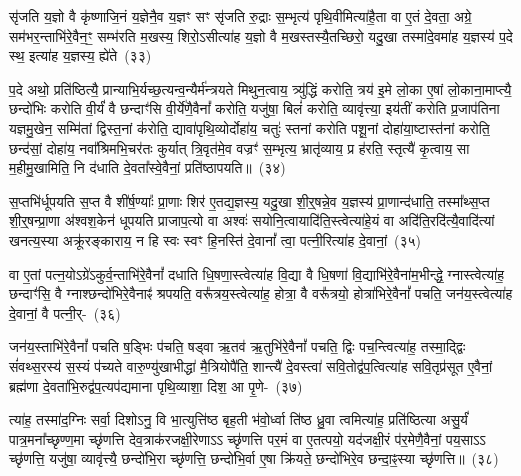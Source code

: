 सृ॑जति य॒ज्ञो वै कृ॑ष्णाजि॒नं य॒ज्ञेनै॒व य॒ज्ञꣳ सꣳ सृ॑जति रु॒द्राः स॒म्भृत्य॑ पृथि॒वीमित्या॑है॒ता वा ए॒तं दे॒वता॒ अग्रे॒ सम॑भर॒न्ताभि॑रे॒वैन॒ꣳ॒ सम्भ॑रति म॒खस्य॒ शिरो॒\-ऽसीत्या॑ह य॒ज्ञो वै म॒खस्तस्यै॒तच्छिरो॒ यदु॒खा तस्मा॑दे॒वमा॑ह य॒ज्ञस्य॑ प॒दे स्थ॒ इत्या॑ह य॒ज्ञस्य॒ ह्ये॑ते~(३३)\ip

प॒दे अथो॒ प्रति॑ष्ठित्यै॒ प्रान्याभि॒र्यच्छ॒त्यन्व॒न्यैर्म॑न्त्रयते मिथुन॒त्वाय॒ त्र्यु॑द्धिं करोति॒ त्रय॑ इ॒मे लो॒का ए॒षां लो॒काना॒माप्त्यै॒ छन्दो॑भिः करोति वी॒र्यं॑ वै छन्दाꣳ॑सि वी॒र्ये॑णै॒वैनां᳚ करोति॒ यजु॑षा॒ बिलं॑ करोति॒ व्यावृ॑त्त्या॒ इय॑तीं करोति प्र॒जा\-प॑तिना यज्ञमु॒खेन॒ सम्मि॑तां द्विस्त॒नां क॑रोति॒ द्यावा॑पृथि॒व्योर्दोहा॑य॒ चतुः॑ स्तनां करोति पशू॒नां दोहा॑या॒ष्टास्त॑नां करोति॒ छन्द॑सां॒ दोहा॑य॒ नवा᳚श्रिमभि॒चर॑तः कुर्यात् त्रि॒वृत॑मे॒व वज्रꣳ॑ स॒म्भृत्य॒ भ्रातृ॑व्याय॒ प्र ह॑रति॒ स्तृत्यै॑ कृ॒त्वाय॒ सा म॒हीमु॒खामिति॒ नि द॑धाति दे॒वता᳚स्वे॒वैनां॒ प्रति॑\-ष्ठापयति॥~(३४)\ip

{\anuvakamend[{तेनै॒व लोम॑भिः॒ समे॒ते अ॑भि॒चर॑त॒ एक॑विꣳशतिश्च}]}

स॒प्तभि॑र्धूपयति स॒प्त वै शी॑र्\mbox{}ष॒ण्याः᳚ प्रा॒णाः शिर॑ ए॒तद्य॒ज्ञस्य॒ यदु॒खा शी॒र्॒\mbox{}षन्ने॒व य॒ज्ञस्य॑ प्रा॒णान्द॑धाति॒ तस्मा᳚थ्स॒प्त शी॒र्॒\mbox{}षन्प्रा॒णा अ॑श्वश॒केन॑ धूपयति प्राजाप॒त्यो वा अश्वः॑ सयोनि॒त्वायादि॑ति॒स्त्वेत्या॑हे॒यं वा अदि॑ति॒रदि॑त्यै॒वादि॑त्यां खनत्य॒स्या अक्रू॑रङ्काराय॒ न हि स्वः स्वꣳ हि॒नस्ति॑ दे॒वानां᳚ त्वा॒ पत्नी॒रित्या॑ह दे॒वानां॒~(३५)\ip

वा ए॒तां पत्न॒यो\-ऽग्रे॑\-ऽकुर्व॒न्ताभि॑रे॒वैनां᳚ दधाति धि॒षणा॒स्त्वेत्या॑ह वि॒द्या वै धि॒षणा॑ वि॒द्याभि॑रे॒वैना॑म॒भीन्द्धे॒ ग्नास्त्वेत्या॑ह॒ छन्दाꣳ॑सि॒ वै ग्नाश्छन्दो॑भिरे॒वैनाꣴ॑ श्रपयति॒ वरू᳚त्रय॒स्त्वेत्या॑ह॒ होत्रा॒ वै वरू᳚त्रयो॒ होत्रा॑भिरे॒वैनां᳚ पचति॒ जन॑य॒स्त्वेत्या॑ह दे॒वानां॒ वै पत्नी॒र्-~(३६)\ip

जन॑य॒स्ताभि॑रे॒वैनां᳚ पचति ष॒ड्भिः प॑चति॒ षड्वा ऋ॒तव॑ ऋ॒तुभि॑रे॒वैनां᳚ पचति॒ द्विः पच॒न्त्वित्या॑ह॒ तस्मा॒द्द्विः सं॑वथ्स॒रस्य॑ स॒स्यं प॑च्यते वारु॒ण्यु॑खाभीद्धा॑ मै॒त्रियोपै॑ति॒ शान्त्यै॑ दे॒वस्त्वा॑ सवि॒तोद्व॑प॒त्वित्या॑ह सवि॒तृप्र॑सूत ए॒वैनां॒ ब्रह्म॑णा दे॒वता॑भि॒रुद्व॑प॒त्यप॑द्यमाना पृथि॒व्याशा॒ दिश॒ आ पृ॒णे-~(३७)\ip

त्या॑ह॒ तस्मा॑द॒ग्निः सर्वा॒ दिशो\-ऽनु॒ वि भा॒त्युत्ति॑ष्ठ बृह॒ती भ॑वो॒र्ध्वा ति॑ष्ठ ध्रु॒वा त्वमित्या॑ह॒ प्रति॑ष्ठित्या असु॒र्यं॑ पात्र॒\-मना᳚च्छृण्ण॒मा च्छृ॑णत्ति देव॒त्राक॑रजक्षी॒रेणा\-ऽऽ च्छृ॑णत्ति पर॒मं वा ए॒तत्पयो॒ यद॑जक्षी॒रं प॑र॒मेणै॒वैनां॒ पय॒सा\-ऽऽ च्छृ॑णत्ति॒ यजु॑षा॒ व्यावृ॑त्त्यै॒ छन्दो॑भि॒रा च्छृ॑णत्ति॒ छन्दो॑भि॒र्वा ए॒षा क्रि॑यते॒ छन्दो॑भिरे॒व छन्दा॒ꣴ॒स्या च्छृ॑णत्ति॥~(३८)\ip

